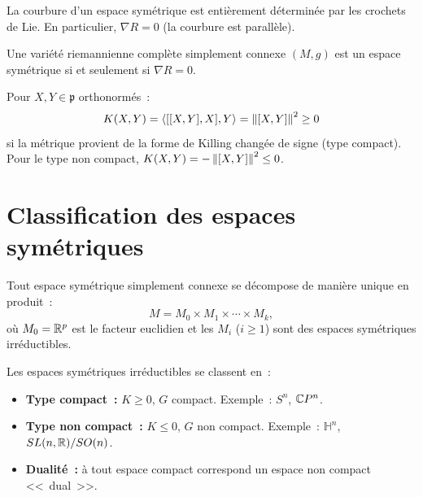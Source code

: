 \begin{corollaire}
La courbure d'un espace sym\'etrique est enti\`erement d\'etermin\'ee par les crochets
de Lie. En particulier, $\nabla R = 0$ (la courbure est parall\`ele).
\end{corollaire}

\begin{theoreme}[Caract\'erisation par $\nabla R = 0$]
Une vari\'et\'e riemannienne compl\`ete simplement connexe $(M, g)$ est un espace
sym\'etrique si et seulement si $\nabla R = 0$.
\end{theoreme}

\begin{proposition}
Pour $X, Y \in \mathfrak{p}$ orthonorm\'es~:
\[
    K(X, Y) = \langle [[X,Y], X], Y \rangle = \left\| [X, Y] \right\|^2 \geq 0
\]
si la m\'etrique provient de la forme de Killing chang\'ee de signe (type compact).
Pour le type non compact, $K(X,Y) = -\left\| [X,Y] \right\|^2 \leq 0$.
\end{proposition}

\section{Classification des espaces sym\'etriques}

\begin{theoreme}
Tout espace sym\'etrique simplement connexe se d\'ecompose de mani\`ere unique en
produit~:
\[
    M = M_0 \times M_1 \times \cdots \times M_k,
\]
o\`u $M_0 = \mathbb{R}^p$ est le facteur euclidien et les $M_i$ ($i \geq 1$) sont des
espaces sym\'etriques irr\'eductibles.
\end{theoreme}

\begin{definition}
Les espaces sym\'etriques irr\'eductibles se classent en~:
\begin{itemize}
    \item \textbf{Type compact~:} $K \geq 0$, $G$ compact. Exemple~: $S^n$, $\mathbb{C} P^n$.
    \item \textbf{Type non compact~:} $K \leq 0$, $G$ non compact.
          Exemple~: $\mathbb{H}^n$, $SL(n,\mathbb{R})/SO(n)$.
    \item \textbf{Dualit\'e~:} \`a tout espace compact correspond un espace non compact
          <<~dual~>>.
\end{itemize}
\end{definition}

